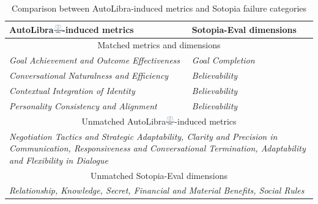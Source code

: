 \begin{table}[!h]
\centering
\begin{tabular}{ll}
    \toprule
    AutoLibra\protect\includegraphics[height=1em]{figs/scale.png}-induced metrics & Sotopia-Eval dimensions\\
    \midrule
    \multicolumn{2}{c}{Matched metrics and dimensions}\\\midrule
    \textit{Goal Achievement and Outcome Effectiveness} & \textit{Goal Completion}\\
    \textit{Conversational Naturalness and Efficiency} & \textit{Believability} \\
    \textit{Contextual Integration of Identity} & \textit{Believability}\\
    \textit{Personality Consistency and Alignment} & \textit{Believability}\\ \midrule
    \multicolumn{2}{c}{Unmatched AutoLibra\protect\includegraphics[height=1em]{figs/scale.png}-induced metrics}\\\midrule
     \multicolumn{2}{C{0.8\textwidth}}{\textit{Negotiation Tactics and Strategic Adaptability, Clarity and Precision in Communication, Responsiveness and Conversational Termination, Adaptability and Flexibility in Dialogue}} \\ \midrule
     \multicolumn{2}{c}{Unmatched Sotopia-Eval dimensions}\\\midrule
     \multicolumn{2}{C{0.8\textwidth}}{\textit{Relationship, Knowledge, Secret, Financial and Material Benefits, Social Rules}} \\\bottomrule
\end{tabular}
\caption{Comparison between AutoLibra-induced metrics and Sotopia failure categories }
\label{tab:lens_sotopia}
\end{table}


